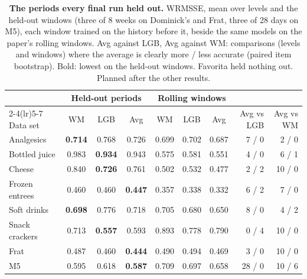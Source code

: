 \begin{table}[t]
\centering
\caption{\textbf{The periods every final run held out.} WRMSSE, mean over
levels and the held-out windows (three of 8 weeks on Dominick's and Frat, three of 28 days on M5), each window trained on
the history before it, beside the same models on the paper's rolling windows. Avg against LGB, Avg against WM:
comparisons (levels and windows) where the average is clearly more / less accurate (paired item bootstrap). Bold: lowest
on the held-out windows. Favorita held nothing out. Planned after the other results.}
\label{tab:heldout}
\footnotesize\setlength{\tabcolsep}{4pt}
\begin{tabular}{lccccccrr}
\toprule
 & \multicolumn{3}{c}{Held-out periods} & \multicolumn{3}{c}{Rolling windows} & & \\
\cmidrule(lr){2-4}\cmidrule(lr){5-7}
Data set & WM & LGB & Avg & WM & LGB & Avg & Avg vs LGB & Avg vs WM \\
\midrule
Analgesics & \textbf{0.714} & 0.768 & 0.726 & 0.699 & 0.702 & 0.687 & 7 / 0 & 2 / 0 \\
Bottled juice & 0.983 & \textbf{0.934} & 0.943 & 0.575 & 0.581 & 0.551 & 4 / 0 & 6 / 1 \\
Cheese & 0.840 & \textbf{0.726} & 0.761 & 0.502 & 0.532 & 0.477 & 2 / 2 & 10 / 0 \\
Frozen entrees & 0.460 & 0.460 & \textbf{0.447} & 0.357 & 0.338 & 0.332 & 6 / 2 & 7 / 0 \\
Soft drinks & \textbf{0.698} & 0.776 & 0.718 & 0.705 & 0.680 & 0.650 & 8 / 0 & 4 / 2 \\
Snack crackers & 0.713 & \textbf{0.557} & 0.593 & 0.893 & 0.778 & 0.790 & 0 / 4 & 10 / 0 \\
Frat & 0.487 & 0.460 & \textbf{0.444} & 0.490 & 0.494 & 0.469 & 3 / 0 & 10 / 0 \\
M5 & 0.595 & 0.618 & \textbf{0.587} & 0.709 & 0.697 & 0.658 & 28 / 0 & 10 / 6 \\
\bottomrule
\end{tabular}
\end{table}

